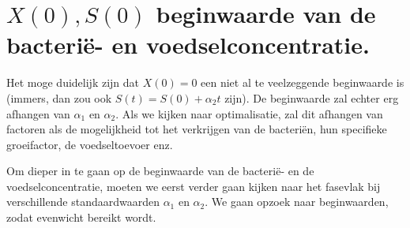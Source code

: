 \section{$X(0), S(0)$ beginwaarde van de bacteri\"e- en voedselconcentratie.}
Het moge duidelijk zijn dat $X(0) = 0$ een niet al te veelzeggende beginwaarde is (immers, dan zou ook $S(t) = S(0) + \alpha_2 t$ zijn). De beginwaarde zal echter erg afhangen van $\alpha_1$ en $\alpha_2$. Als we kijken naar optimalisatie, zal dit afhangen van factoren als de mogelijkheid tot het verkrijgen van de bacteri\"en, hun specifieke groeifactor, de voedseltoevoer enz.  

Om dieper in te gaan op de beginwaarde van de bacteri\"e- en de voedselconcentratie, moeten we eerst verder gaan kijken naar het fasevlak bij verschillende standaardwaarden $\alpha_1$ en $\alpha_2$. We gaan opzoek naar beginwaarden, zodat evenwicht bereikt wordt.













